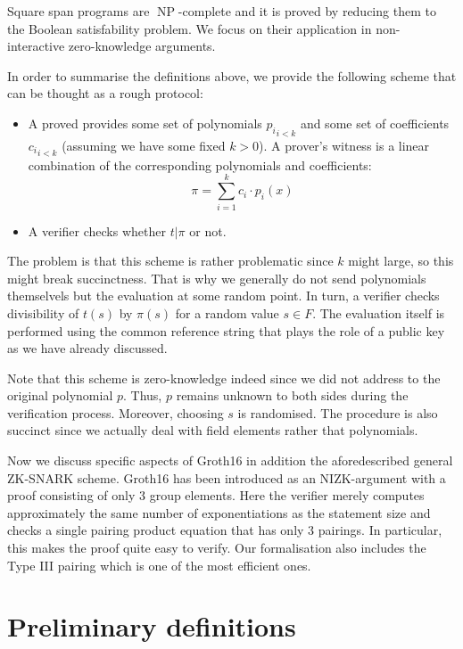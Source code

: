 \documentclass{article}
\theoremstyle{definition}
\theoremstyle{remark}
\begin{document}
Square span programs are $\operatorname{NP}$-complete and it is proved by reducing them to the Boolean satisfability problem.
We focus on their application in non-interactive zero-knowledge arguments.

In order to summarise the definitions above, we provide the following scheme that can be thought as a rough protocol:
\begin{itemize}
  \item A proved provides some set of polynomials ${p_i}_{i < k}$ and some set of coefficients ${c_i}_{i < k}$ (assuming we have some fixed $k > 0$). A prover's witness is a linear combination of the corresponding polynomials and coefficients:
  \begin{equation}
  \pi = \sum \limits_{i = 1}^{k} c_i \cdot p_i(x)
  \end{equation}
  \item A verifier checks whether $t | \pi$ or not.
\end{itemize}

The problem is that this scheme is rather problematic since $k$ might large, so this might break succinctness.
That is why we generally do not send polynomials themselvels but the evaluation at some random point.
In turn, a verifier checks divisibility of $t(s)$ by $\pi(s)$ for a random value $s \in F$.
The evaluation itself is performed using the common reference string that plays the role of a
public key as we have already discussed.

Note that this scheme is zero-knowledge indeed since we did not address to the original polynomial $p$.
Thus, $p$ remains unknown to both sides during the verification process. Moreover, choosing $s$ is randomised.
The procedure is also succinct since we actually deal with field elements rather that polynomials.

Now we discuss specific aspects of Groth16 in addition the aforedescribed general ZK-SNARK scheme.
Groth16 has been introduced as an NIZK-argument with a proof consisting of only 3 group elements.
Here the verifier merely computes approximately the same number of exponentiations as the statement size
and checks a single pairing product equation that has only 3 pairings.
In particular, this makes the proof quite easy to verify.
Our formalisation also includes the Type III pairing which is one of the most efficient ones.

\section{Preliminary definitions}
\end{document}
